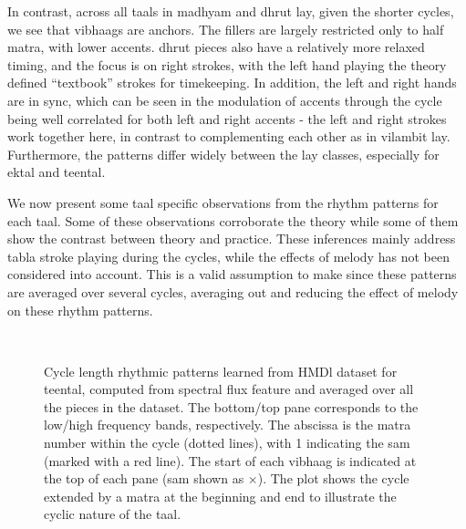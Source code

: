 In contrast, across all \glspl{taal} in \gls{madhyam} and \gls{dhrut} \gls{lay}, given the shorter cycles, we see that \glspl{vibhaag} are anchors. The fillers are largely restricted only to half \gls{matra}, with lower accents. \Gls{dhrut} pieces also have a relatively more relaxed timing, and the focus is on right strokes, with the left hand playing the theory defined ``textbook” strokes for timekeeping. In addition, the left and right hands are in sync, which can be seen in the modulation of accents through the cycle being well correlated for both left and right accents - the left and right strokes work together here, in contrast to complementing each other as in \gls{vilambit} \gls{lay}. Furthermore, the patterns differ widely between the \gls{lay} classes, especially for \gls{ektal} and \gls{teental}. 

We now present some \gls{taal} specific observations from the rhythm patterns for each \gls{taal}. Some of these observations corroborate the theory while some of them show the contrast between theory and practice. These inferences mainly address \gls{tabla} stroke playing during the cycles, while the effects of melody has not been considered into account. This is a valid assumption to make since these patterns are averaged over several cycles, averaging out and reducing the effect of melody on these rhythm patterns. 
\begin{figure}[t]
\captionsetup[subfigure]{labelformat=empty}
\centering
{} \\ \vspace{-1.35cm}
\caption[Rhythm patterns in \gls{teental} learned from \acrshort{HMDl} dataset]{Cycle length rhythmic patterns learned from \acrshort{HMDl} dataset for \gls{teental}, computed from spectral flux feature and averaged over all the pieces in the dataset. The bottom/top pane corresponds to the low/high frequency bands, respectively. The abscissa is the \gls{matra} number within the cycle (dotted lines), with 1 indicating the \gls{sam} (marked with a red line). The start of each \gls{vibhaag} is indicated at the top of each pane (\gls{sam} shown as $\times$). The plot shows the cycle extended by a \gls{matra} at the beginning and end to illustrate the cyclic nature of the \gls{taal}.}\label{fig:tt:HMDl:teen} %
\end{figure}
